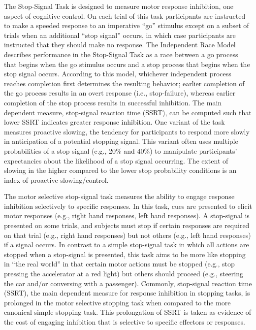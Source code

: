 \documentclass[titlepage,12pt] {article}
\begin{document}
The Stop-Signal Task is designed to measure motor response inhibition, one aspect of cognitive control. On each trial of this task participants are instructed to make a speeded response to an imperative ``go'' stimulus except on a subset of trials when an additional ``stop signal'' occurs, in which case participants are instructed that they should make no response. The Independent Race Model describes performance in the Stop-Signal Task as a race between a go process that begins when the go stimulus occurs and a stop process that begins when the stop signal occurs. According to this model, whichever independent process reaches completion first determines the resulting behavior; earlier completion of the go process results in an overt response (i.e., stop-failure), whereas earlier completion of the stop process results in successful inhibition. The main dependent measure, stop-signal reaction time (SSRT), can be computed such that lower SSRT indicates greater response inhibition. One variant of the task measures proactive slowing, the tendency for participants to respond more slowly in anticipation of a potential stopping signal. This variant often uses multiple probabilities of a stop signal (e.g., 20\% and 40\%) to manipulate participants’ expectancies about the likelihood of a stop signal occurring. The extent of slowing in the higher compared to the lower stop probability conditions is an index of proactive slowing/control.

The motor selective stop-signal task measures the ability to engage response inhibition selectively to specific responses. In this task, cues are presented to elicit motor responses (e.g., right hand responses, left hand responses). A stop-signal is presented on some trials, and subjects must stop if certain responses are required on that trial (e.g., right hand responses) but not others (e.g., left hand responses) if a signal occurs. In contrast to a simple stop-signal task in which all actions are stopped when a stop-signal is presented, this task aims to be more like stopping in ``the real world'' in that certain motor actions must be stopped (e.g., stop pressing the accelerator at a red light) but others should proceed (e.g., steering the car and/or conversing with a passenger). Commonly, stop-signal reaction time (SSRT), the main dependent measure for response inhibition in stopping tasks, is prolonged in the motor selective stopping task when compared to the more canonical simple stopping task. This prolongation of SSRT is taken as evidence of the cost of engaging inhibition that is selective to specific effectors or responses.
\end{document}
